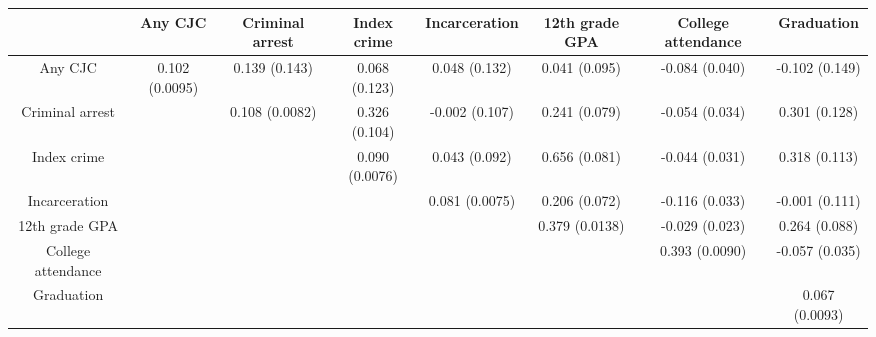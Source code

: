 \begin{tabular}{cccccccc}
\toprule
 & Any CJC & Criminal arrest & Index crime & Incarceration & 12th grade GPA & College attendance & Graduation \\
\midrule
Any CJC & 0.102 (0.0095) & 0.139 (0.143) & 0.068 (0.123) & 0.048 (0.132) & 0.041 (0.095) & -0.084 (0.040) & -0.102 (0.149) \\
Criminal arrest &  & 0.108 (0.0082) & 0.326 (0.104) & -0.002 (0.107) & 0.241 (0.079) & -0.054 (0.034) & 0.301 (0.128) \\
Index crime &  &  & 0.090 (0.0076) & 0.043 (0.092) & 0.656 (0.081) & -0.044 (0.031) & 0.318 (0.113) \\
Incarceration &  &  &  & 0.081 (0.0075) & 0.206 (0.072) & -0.116 (0.033) & -0.001 (0.111) \\
12th grade GPA &  &  &  &  & 0.379 (0.0138) & -0.029 (0.023) & 0.264 (0.088) \\
College attendance &  &  &  &  &  & 0.393 (0.0090) & -0.057 (0.035) \\
Graduation &  &  &  &  &  &  & 0.067 (0.0093) \\
\bottomrule
\end{tabular}
